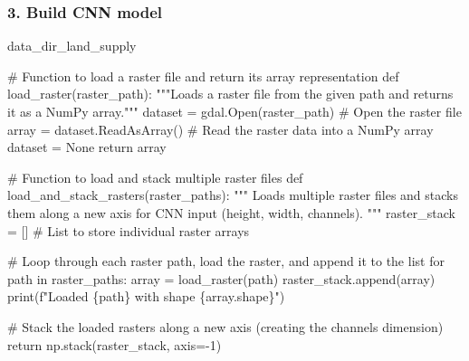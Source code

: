 \documentclass[
  letterpaper,
]{article}
\newenvironment{Shaded}{\begin{snugshade}}{\end{snugshade}}
\newcommand{\BuiltInTok}[1]{\textcolor[rgb]{0.00,0.23,0.31}{#1}}
\newcommand{\CommentTok}[1]{\textcolor[rgb]{0.37,0.37,0.37}{#1}}
\newcommand{\ControlFlowTok}[1]{\textcolor[rgb]{0.00,0.23,0.31}{#1}}
\newcommand{\DecValTok}[1]{\textcolor[rgb]{0.68,0.00,0.00}{#1}}
\newcommand{\KeywordTok}[1]{\textcolor[rgb]{0.00,0.23,0.31}{#1}}
\newcommand{\NormalTok}[1]{\textcolor[rgb]{0.00,0.23,0.31}{#1}}
\newcommand{\OperatorTok}[1]{\textcolor[rgb]{0.37,0.37,0.37}{#1}}
\newcommand{\SpecialCharTok}[1]{\textcolor[rgb]{0.37,0.37,0.37}{#1}}
\newcommand{\SpecialStringTok}[1]{\textcolor[rgb]{0.13,0.47,0.30}{#1}}
\newcommand{\VariableTok}[1]{\textcolor[rgb]{0.07,0.07,0.07}{#1}}
\begin{document}
\subsubsection{3. Build CNN model}\label{build-cnn-model}

data\_dir\_land\_supply

\begin{Shaded}
\begin{Highlighting}[]
\CommentTok{\# Function to load a raster file and return its array representation}
\KeywordTok{def}\NormalTok{ load\_raster(raster\_path):}
    \CommentTok{"""Loads a raster file from the given path and returns it as a NumPy array."""}
\NormalTok{    dataset }\OperatorTok{=}\NormalTok{ gdal.Open(raster\_path)  }\CommentTok{\# Open the raster file}
\NormalTok{    array }\OperatorTok{=}\NormalTok{ dataset.ReadAsArray()     }\CommentTok{\# Read the raster data into a NumPy array}
\NormalTok{    dataset }\OperatorTok{=} \VariableTok{None}
    \ControlFlowTok{return}\NormalTok{ array}

\CommentTok{\# Function to load and stack multiple raster files}
\KeywordTok{def}\NormalTok{ load\_and\_stack\_rasters(raster\_paths):}
    \CommentTok{"""}
\CommentTok{    Loads multiple raster files and stacks them along a new axis for CNN input}
\CommentTok{    (height, width, channels).}
\CommentTok{    """}
\NormalTok{    raster\_stack }\OperatorTok{=}\NormalTok{ []  }\CommentTok{\# List to store individual raster arrays}
    
    \CommentTok{\# Loop through each raster path, load the raster, and append it to the list}
    \ControlFlowTok{for}\NormalTok{ path }\KeywordTok{in}\NormalTok{ raster\_paths:}
\NormalTok{        array }\OperatorTok{=}\NormalTok{ load\_raster(path)}
\NormalTok{        raster\_stack.append(array)}
        \BuiltInTok{print}\NormalTok{(}\SpecialStringTok{f"Loaded }\SpecialCharTok{\{}\NormalTok{path}\SpecialCharTok{\}}\SpecialStringTok{ with shape }\SpecialCharTok{\{}\NormalTok{array}\SpecialCharTok{.}\NormalTok{shape}\SpecialCharTok{\}}\SpecialStringTok{"}\NormalTok{)}
    
    \CommentTok{\# Stack the loaded rasters along a new axis (creating the \textquotesingle{}channels\textquotesingle{} dimension)}
    \ControlFlowTok{return}\NormalTok{ np.stack(raster\_stack, axis}\OperatorTok{={-}}\DecValTok{1}\NormalTok{)}


\end{Highlighting}
\end{Shaded}
\end{document}
